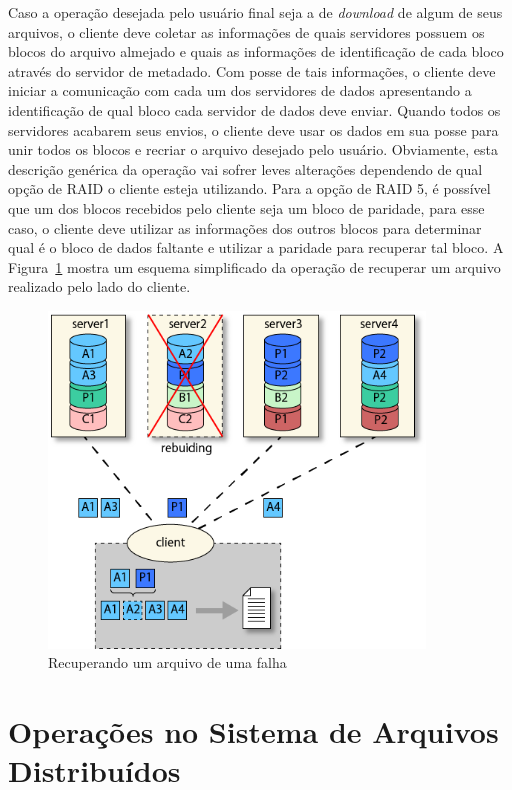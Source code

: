 	Caso a operação desejada pelo usuário final seja a de \textit{download} de algum de seus arquivos, o cliente deve coletar as informações de quais servidores possuem os blocos do arquivo almejado e quais as informações de identificação de cada bloco através do servidor de metadado. Com posse de tais informações, o cliente deve iniciar a comunicação com cada um dos servidores de dados apresentando a identificação de qual bloco cada servidor de dados deve enviar. Quando todos os servidores acabarem seus envios, o cliente deve usar os dados em sua posse para unir todos os blocos e recriar o arquivo desejado pelo usuário. Obviamente, esta descrição genérica da operação vai sofrer leves alterações dependendo de qual opção de RAID o cliente esteja utilizando. Para a opção de RAID 5, é possível que um dos blocos recebidos pelo cliente seja um bloco de paridade, para esse caso, o cliente deve utilizar as informações dos outros blocos para determinar qual é o bloco de dados faltante e utilizar a paridade para recuperar tal bloco. A Figura~\ref{fig:img2} mostra um esquema simplificado da operação de recuperar um arquivo realizado pelo lado do cliente.
	\\
	
	\begin{figure}[htb]
		\begin{center}
			
			\includegraphics[clip,width=10.0cm]{images/image2.png}
			\caption{Recuperando um arquivo de uma falha}
			\label{fig:img2}
		\end{center}
	\end{figure}
	
	\section{Operações no Sistema de Arquivos Distribuídos}
	
